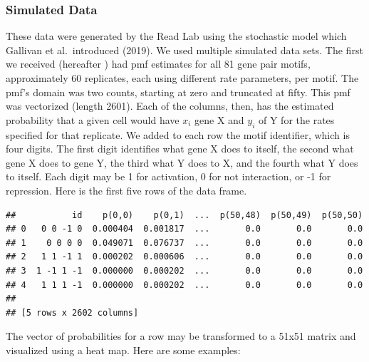 \documentclass[
]{article}
\begin{document}
\hypertarget{simulated-data}{%
\subsubsection{Simulated Data}\label{simulated-data}}

These data were generated by the Read Lab using the stochastic model
which Gallivan et al.~introduced (2019). We used multiple simulated data
sets. The first we received (hereafter ) had pmf estimates for all 81
gene pair motifs, approximately 60 replicates, each using different rate
parameters, per motif. The pmf's domain was two counts, starting at zero
and truncated at fifty. This pmf was vectorized (length 2601). Each of
the columns, then, has the estimated probability that a given cell would
have \(x_i\) gene X and \(y_i\) of Y for the rates specified for that
replicate. We added to each row the motif identifier, which is four
digits. The first digit identifies what gene X does to itself, the
second what gene X does to gene Y, the third what Y does to X, and the
fourth what Y does to itself. Each digit may be 1 for activation, 0 for
not interaction, or -1 for repression. Here is the first five rows of
the data frame.

\begin{verbatim}
##           id    p(0,0)    p(0,1)  ...  p(50,48)  p(50,49)  p(50,50)
## 0   0 0 -1 0  0.000404  0.001817  ...       0.0       0.0       0.0
## 1    0 0 0 0  0.049071  0.076737  ...       0.0       0.0       0.0
## 2   1 1 -1 1  0.000202  0.000606  ...       0.0       0.0       0.0
## 3  1 -1 1 -1  0.000000  0.000202  ...       0.0       0.0       0.0
## 4   1 1 1 -1  0.000000  0.000202  ...       0.0       0.0       0.0
## 
## [5 rows x 2602 columns]
\end{verbatim}

The vector of probabilities for a row may be transformed to a 51x51
matrix and visualized using a heat map. Here are some examples:
\end{document}
